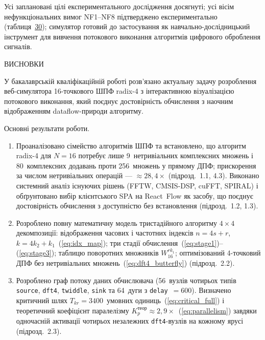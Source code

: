 Усі заплановані цілі експериментального дослідження досягнуті; усі вісім
нефункціональних вимог NF1--NF8 підтверджено експериментально
(таблиця~\hyperref[tab:nf_verify]{30}); симулятор готовий до
застосування як навчально-дослідницький інструмент для вивчення
потокового виконання алгоритмів цифрового оброблення сигналів.

ВИСНОВКИ

У бакалаврській кваліфікаційній роботі розв'язано актуальну задачу
розроблення веб-симулятора 16-точкового ШПФ radix-4 з інтерактивною
візуалізацією потокового виконання, який поєднує достовірність
обчислення з наочним відображенням dataflow-природи алгоритму.

Основні результати роботи.

\begin{enumerate}
\def\labelenumi{\arabic{enumi}.}
\item
  Проаналізовано сімейство алгоритмів ШПФ та встановлено, що алгоритм
  radix-4 для \(N = 16\) потребує лише 9~нетривіальних комплексних
  множень і 80~комплексних додавань проти 256~множень у прямому ДПФ;
  прискорення за числом нетривіальних операцій ---
  \(\approx 28,4 \times\) (підрозд.~1.1, 4.3). Виконано системний аналіз
  існуючих рішень (FFTW, CMSIS-DSP, cuFFT, SPIRAL) і обґрунтовано вибір
  клієнтського SPA на React~Flow як засобу, що поєднує достовірність
  обчислення з доступністю без встановлення (підрозд.~1.2, 1.3).
\item
  Розроблено повну математичну модель тристадійного алгоритму
  \(4 \times 4\) декомпозиції: відображення часових і частотних індексів
  \(n = 4s + r\),
  \(k = 4k_{2} + k_{1}\)~(\hyperref[eq:idx_map]{{[}eq:idx\_map{]}}); три
  стадії
  обчислення~(\hyperref[eq:stage1]{{[}eq:stage1{]}})--(\hyperref[eq:stage3]{{[}eq:stage3{]}});
  таблицю поворотних множників \(W_{16}^{rk_{1}}\); оптимізований
  4-точковий ДПФ без нетривіальних
  множень~(\hyperref[eq:dft4_butterfly]{{[}eq:dft4\_butterfly{]}})
  (підрозд.~2.2).
\item
  Розроблено граф потоку даних обчислювача (56~вузлів чотирьох типів
  \texttt{source}, \texttt{dft4}, \texttt{twiddle}, \texttt{sink} та
  64~дуги з \texttt{delay}~\(= 600\)). Визначено критичний шлях
  \(T_{kr} = 3400\)~умовних
  одиниць~(\hyperref[eq:critical_full]{{[}eq:critical\_full{]}}) і
  теоретичний коефіцієнт паралелізму
  \(K_{p}^{\text{теор}} \approx 2,9 \times\)~(\hyperref[eq:parallelism]{{[}eq:parallelism{]}})
  завдяки одночасній активації чотирьох незалежних \texttt{dft4}-вузлів
  на кожному ярусі (підрозд.~2.3).

\end{enumerate}
